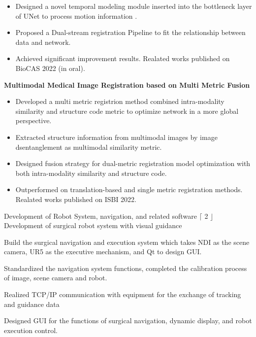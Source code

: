 \begin{cventries}
{\begin{itemize}[leftmargin=*]
        \item Designed a novel temporal modeling module inserted into the bottleneck layer of UNet to process motion information .
        \item Proposed a Dual-stream registration Pipeline to fit the relationship between data and network.
        \item Achieved significant improvement results. Realated works published on BioCAS 2022 (in oral).
      \end{itemize}
      \textbf{Multimodal Medical Image Registration based on Multi Metric Fusion}
      \begin{itemize}[leftmargin=*]
        \item Developed a multi metric registrion method combined intra-modality similarity and structure code metric to optimize network in a more global perspective.
        \item Extracted structure information from multimodal images by image dsentanglement as multimodal similarity metric.
        \item Designed fusion strategy for dual-metric registration model optimization with both intra-modality similarity and structure code.
        \item Outperformed on translation-based and single metric registration methods. Realated works published on ISBI 2022.
      \end{itemize}
    }
  \cventry
    {Development of Robot System, navigation, and related software  } %
    {$\lceil$ 2 $\rfloor$ Development of surgical robot system with visual guidance} %
    {} %
    {} %
    {
      \begin{cvitems} %
        \item Build the surgical navigation and execution system which takes NDI as the scene camera, UR5 as the executive mechanism, and Qt to design GUI.
        \item Standardized the navigation system functions, completed the calibration process of image, scene camera and robot.
        \item Realized TCP/IP communication with equipment for the exchange of tracking and guidance data
        \item Designed GUI for the functions of surgical navigation, dynamic display, and robot execution control.
      \end{cvitems}
    }

\end{cventries}
